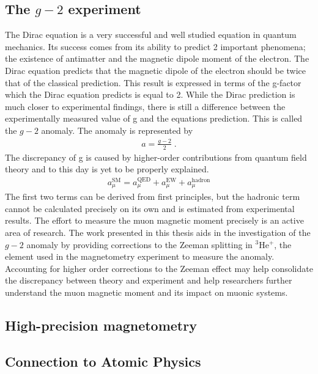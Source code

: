         \subsection{The $g-2$ experiment}\label{sec:g-2}
        The Dirac equation is a very successful and well studied equation in quantum mechanics. Its success comes from its ability to predict 2 important phenomena; the existence of antimatter and the magnetic dipole moment of the electron. The Dirac equation predicts that the magnetic dipole of the electron should be twice that of the classical prediction. This result is expressed in terms of the g-factor which the Dirac equation predicts is equal to 2. While the Dirac prediction is much closer to experimental findings, there is still a difference between the experimentally measured value of g and the equations prediction. This is called the $g-2$ anomaly. The anomaly is represented by
        \begin{align}
            a = \frac{g - 2}{2}\;.
        \end{align}
        \noindent The discrepancy of g is caused by higher-order contributions from quantum field theory and to this day is yet to be properly explained. 
        \begin{align}
            a^{\text{SM}}_\mu = a_\mu^{\text{QED}} + a_\mu^{\text{EW}} + a_\mu^{\text{hadron}}
        \end{align}
        \noindent The first two terms can be derived from first principles, but the hadronic term cannot be calculated precisely on its own and is estimated from experimental results. The effort to measure the muon magnetic moment precisely is an active area of research. The work presented in this thesis aids in the investigation of the $g-2$ anomaly by providing corrections to the Zeeman splitting in $^3$He$^+$, the element used in the magnetometry experiment to measure the anomaly. Accounting for higher order corrections to the Zeeman effect may help consolidate the discrepancy between theory and experiment and help researchers further understand the muon magnetic moment and its impact on muonic systems.

        \subsection{High-precision magnetometry}\label{sec:High-Precision-magnetometry}
        \subsection{Connection to Atomic Physics}\label{sec:Connection_To_AMO}

